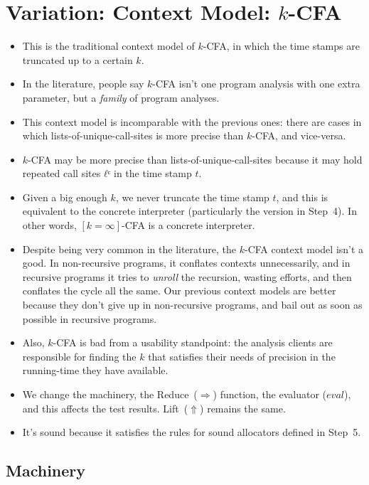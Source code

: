 \documentclass[12pt, oneside]{book}
\begin{document}
\section{Variation: Context Model: \(k\)-CFA}

\begin{itemize}
  \item This is the traditional context model of \(k\)-CFA, in which the time stamps are truncated up to a certain \(k\).
  \item In the literature, people say \(k\)-CFA isn’t one program analysis with one extra parameter, but a \emph{family} of program analyses.
  \item This context model is incomparable with the previous ones: there are cases in which lists-of-unique-call-sites is more precise than \(k\)-CFA, and vice-versa.
  \item \(k\)-CFA may be more precise than lists-of-unique-call-sites because it may hold repeated call sites \(ℓᶜ\) in the time stamp \(t\).
  \item Given a big enough \(k\), we never truncate the time stamp \(t\), and this is equivalent to the concrete interpreter (particularly the version in Step~4). In other words, \([k=∞]\)-CFA is a concrete interpreter.
  \item Despite being very common in the literature, the \(k\)-CFA context model isn’t a good. In non-recursive programs, it conflates contexts unnecessarily, and in recursive programs it tries to \emph{unroll} the recursion, wasting efforts, and then conflates the cycle all the same. Our previous context models are better because they don’t give up in non-recursive programs, and bail out as soon as possible in recursive programs.
  \item Also, \(k\)-CFA is bad from a usability standpoint: the analysis clients are responsible for finding the \(k\) that satisfies their needs of precision in the running-time they have available.
  \item We change the machinery, the Reduce~(\(⇒\)) function, the evaluator (\(eval\)), and this affects the test results. Lift~(\(⇑\)) remains the same.
  \item It’s sound because it satisfies the rules for sound allocators defined in Step~5.
\end{itemize}

\subsection{Machinery}
\end{document}
